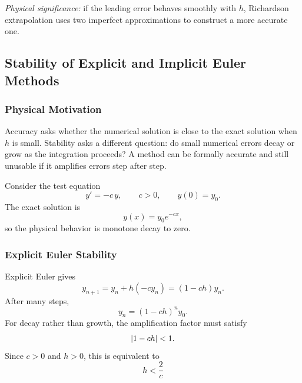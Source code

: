 \textit{Physical significance:} if the leading error behaves smoothly with
$h$, Richardson extrapolation uses two imperfect approximations to construct
a more accurate one.

\subsection{Stability of Explicit and Implicit Euler Methods}
\label{subsec:lec06:stability}

\subsubsection*{Physical Motivation}
Accuracy asks whether the numerical solution is close to the exact solution
when $h$ is small. Stability asks a different question: do small numerical
errors decay or grow as the integration proceeds? A method can be formally
accurate and still unusable if it amplifies errors step after step.

Consider the test equation
\begin{equation}
    y'=-c\,y,
    \qquad c>0,
    \qquad y(0)=y_0.
    \label{eq:lec06:decay-equation}
\end{equation}
The exact solution is
\begin{equation}
    y(x)=y_0 e^{-cx},
    \label{eq:lec06:decay-exact}
\end{equation}
so the physical behavior is monotone decay to zero.

\subsubsection{Explicit Euler Stability}
Explicit Euler gives
\begin{equation}
    y_{n+1}
    =y_n+h(-c y_n)
    =(1-ch)y_n.
    \label{eq:lec06:explicit-euler-decay}
\end{equation}
After many steps,
\begin{equation}
    y_n=(1-ch)^n y_0.
    \label{eq:lec06:explicit-euler-many}
\end{equation}
For decay rather than growth, the amplification factor must satisfy
\begin{equation}
    \left|1-ch\right|<1.
    \label{eq:lec06:explicit-stability-ineq}
\end{equation}
Since $c>0$ and $h>0$, this is equivalent to
\begin{equation}
    \boxed{
    h<\frac{2}{c}}
    \label{eq:lec06:explicit-stability-condition}
\end{equation}

